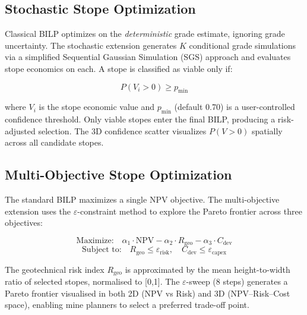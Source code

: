 \documentclass[12pt,a4paper]{article}
\begin{document}
\subsection{Stochastic Stope Optimization}
\label{sec:stochastic}

Classical BILP optimizes on the \emph{deterministic} grade estimate, ignoring grade uncertainty. The stochastic extension generates $K$ conditional grade simulations via a simplified Sequential Gaussian Simulation (SGS) approach and evaluates stope economics on each. A stope is classified as viable only if:

\begin{equation}
  P(V_i > 0) \geq p_{\min}
\end{equation}

where $V_i$ is the stope economic value and $p_{\min}$ (default 0.70) is a user-controlled confidence threshold. Only viable stopes enter the final BILP, producing a risk-adjusted selection. The 3D confidence scatter visualizes $P(V>0)$ spatially across all candidate stopes.

\subsection{Multi-Objective Stope Optimization}
\label{sec:multiobjective}

The standard BILP maximizes a single NPV objective. The multi-objective extension uses the $\varepsilon$-constraint method to explore the Pareto frontier across three objectives:

\begin{equation}
  \text{Maximize:} \quad \alpha_1 \cdot \text{NPV} - \alpha_2 \cdot R_{\text{geo}} - \alpha_3 \cdot C_{\text{dev}}
\end{equation}
\begin{equation}
  \text{Subject to:} \quad R_{\text{geo}} \leq \varepsilon_{\text{risk}}, \quad C_{\text{dev}} \leq \varepsilon_{\text{capex}}
\end{equation}

The geotechnical risk index $R_{\text{geo}}$ is approximated by the mean height-to-width ratio of selected stopes, normalised to [0,1]. The $\varepsilon$-sweep (8 steps) generates a Pareto frontier visualised in both 2D (NPV vs Risk) and 3D (NPV--Risk--Cost space), enabling mine planners to select a preferred trade-off point.
\end{document}
